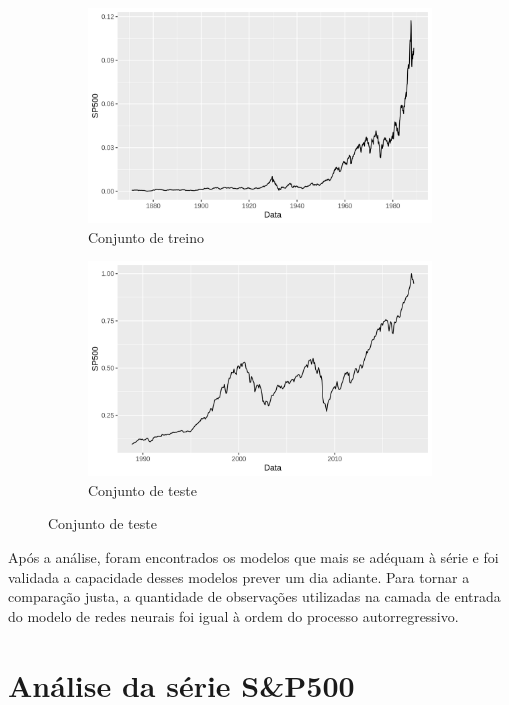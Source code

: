 \documentclass[
    12pt,
    oneside,
    a4paper,
    english,
    brazil
]{abntex2}
\begin{document}
\begin{figure}[ht]
    \caption{Divisão da série entre os conjuntos de treino e teste}\label{fig:traintest}
    \begin{subfigure}{.5\textwidth}
        \centering
        \includegraphics[width=.8\linewidth]{images/SP500_train.png}
        \caption{Conjunto de treino}
    \end{subfigure}
    \begin{subfigure}{.5\textwidth}
        \centering
        \includegraphics[width=.8\linewidth]{images/SP500_test.png}
        \caption{Conjunto de teste}
    \end{subfigure}
\end{figure}

Após a análise, foram encontrados os modelos  que mais se adéquam à série e foi
validada  a capacidade  desses  modelos  prever um  dia  adiante.  Para tornar  a
comparação justa,  a quantidade de observações  utilizadas na
camada  de entrada  do modelo  de  redes neurais  foi igual à ordem  do
processo autorregressivo.

\section{Análise da série S\&P500}
\end{document}
